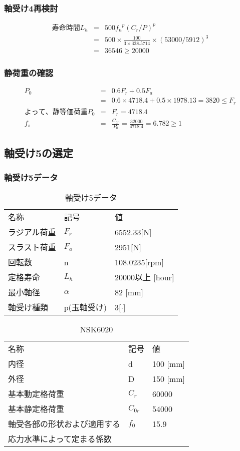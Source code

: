 \subsubsection{軸受け4再検討}
\begin{eqnarray}
寿命時間L_h &=& 500{f_n}^p(C_r/P)^p\\
           &=& 500 \times \frac{100}{3 \times 328.5714} \times (53000/5912)^3\\
           &=& 36546 \geq 20000
\end{eqnarray}

\subsubsection{静荷重の確認}
\begin{eqnarray}
P_0&=&0.6F_r+0.5F_a\\
   &=&0.6 \times 4718.4 + 0.5 \times 1978.13 = 3820 \leq F_r\\
よって、静等価荷重P_0 &=& F_r = 4718.4\\
f_s &=& \frac{C_{0r}}{P_0} = \frac{32000}{4718.4} = 6.782\geq 1
\end{eqnarray}


\newpage
\subsection{軸受け5の選定}
\subsubsection{軸受け5データ}
\begin{table}[htb]
\begin{center}
  \caption{軸受け5データ}
  \begin{tabular}{lll} \hline
名称&記号&値\\
ラジアル荷重&$F_r$&6552.33[N]\\
スラスト荷重&$F_a$&2951[N]\\
回転数&n&108.0235[rpm]\\
定格寿命&$L_h$&20000以上 [hour]\\
最小軸径&$\alpha$&82 [mm]\\
軸受け種類&p(玉軸受け)&3[$\cdot$]\\
\hline
  \end{tabular}
\end{center}
\end{table}

\begin{table}[htb]
\begin{center}
  \caption{NSK6020}
  \begin{tabular}{lll} \hline
名称&記号&値\\
内径& d & 100 [mm]\\
外径& D & 150 [mm]\\
基本動定格荷重&$C_{r}$&60000\\
基本静定格荷重&$C_{0r}$&54000\\
軸受各部の形状および適用する&$f_0$&15.9\\
応力水準によって定まる係数&&\\
\hline
  \end{tabular}
\end{center}
\end{table}

